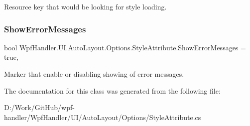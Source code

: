 Resource key that would be looking for style loading. 

\mbox{\label{class_wpf_handler_1_1_u_i_1_1_auto_layout_1_1_options_1_1_style_attribute_a86e104f756eca13578f07d3c04832a7a}} 
\subsubsection{\texorpdfstring{Show\+Error\+Messages}{ShowErrorMessages}}
{\footnotesize\ttfamily bool Wpf\+Handler.\+U\+I.\+Auto\+Layout.\+Options.\+Style\+Attribute.\+Show\+Error\+Messages = true\hspace{0.3cm}{\ttfamily [get]}, {\ttfamily [set]}}



Marker that enable or disabling showing of error messages. 



The documentation for this class was generated from the following file\+:\begin{DoxyCompactItemize}
\item 
D\+:/\+Work/\+Git\+Hub/wpf-\/handler/\+Wpf\+Handler/\+U\+I/\+Auto\+Layout/\+Options/Style\+Attribute.\+cs\end{DoxyCompactItemize}
